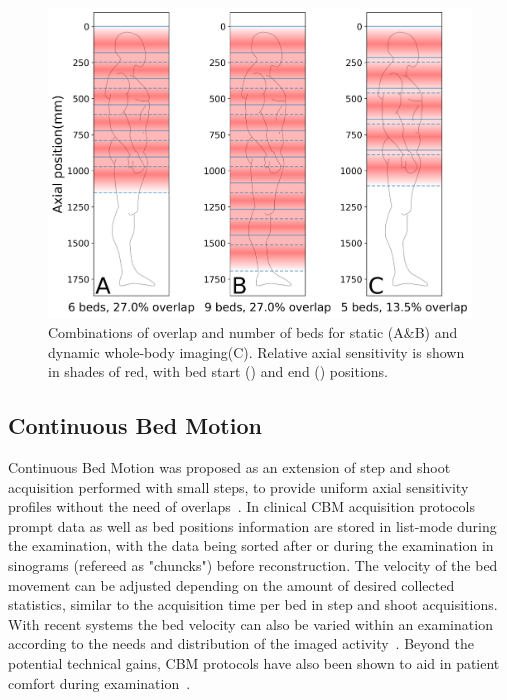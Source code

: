 \begin{figure} [ht!]
\centering
\includegraphics[scale=0.5,angle=0]{3_Results/3_1_DWB_Optimization/figures/SensitivityProfiles_overHuman.png}
\caption{Combinations of overlap and number of beds for static (A\&B) and dynamic whole-body imaging(C). Relative axial sensitivity is shown in shades of red, with bed start (\protect{}) and end (\protect{}) positions.} 
\label{fig3_1:BodyCoverage}
\end{figure}



\subsection{Continuous Bed Motion}
Continuous Bed Motion was proposed as an extension of step and shoot acquisition performed with small steps, to provide uniform axial sensitivity profiles without the need of overlaps~\cite{Dahlbom2001,Brasse2002}. In clinical CBM acquisition protocols prompt data as well as bed positions information are stored in list-mode during the examination, with the data being sorted after or during the examination in sinograms (refereed as "chuncks") before reconstruction. The velocity of the bed movement can be adjusted depending on the amount of desired collected statistics, similar to the acquisition time per bed in step and shoot acquisitions. With recent systems the bed velocity can also be varied within an examination according to the needs and distribution of the imaged activity~\cite{Panin2014}. Beyond the potential technical gains, CBM protocols have also been shown to aid in patient comfort during examination~\cite{Schatka2016}. 

